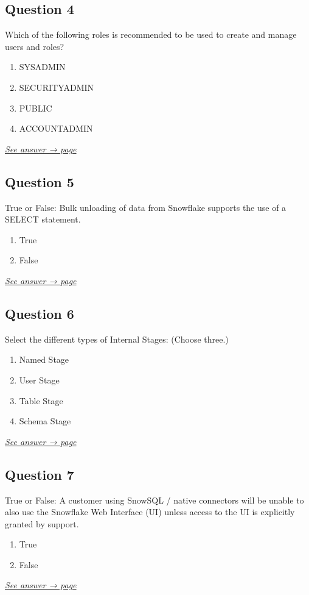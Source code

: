 \documentclass[12pt]{article}
\newcommand{\seeanswer}[1]{%
  \par\smallskip\emph{\hyperref[ans:#1]{See answer → page \pageref{ans:#1}}}%
}
\begin{document}
\subsection*{Question 4}\label{q:4}
Which of the following roles is recommended to be used to create and manage users and roles?

\begin{enumerate}[label=\Alph*.]
  \item SYSADMIN
  \item SECURITYADMIN
  \item PUBLIC
  \item ACCOUNTADMIN
\end{enumerate}
\seeanswer{4}

\subsection*{Question 5}\label{q:5}
True or False: Bulk unloading of data from Snowflake supports the use of a SELECT statement.

\begin{enumerate}[label=\Alph*.]
  \item True
  \item False
\end{enumerate}
\seeanswer{5}

\subsection*{Question 6}\label{q:6}
Select the different types of Internal Stages: (Choose three.)

\begin{enumerate}[label=\Alph*.]
  \item Named Stage
  \item User Stage
  \item Table Stage
  \item Schema Stage
\end{enumerate}
\seeanswer{6}

\subsection*{Question 7}\label{q:7}
True or False: A customer using SnowSQL / native connectors will be unable to also use the Snowflake Web Interface (UI) unless access to the UI is explicitly granted by support.

\begin{enumerate}[label=\Alph*.]
  \item True
  \item False
\end{enumerate}
\seeanswer{7}
\end{document}
